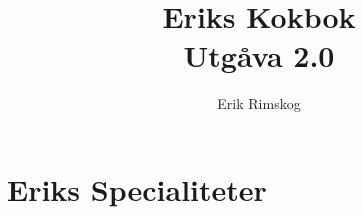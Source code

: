 \documentclass[12pt,a4paper]{article}
\title{\Huge Eriks Kokbok\\\medskip
  \large Utgåva 2.0}
\author{Erik Rimskog}
\begin{document}
\maketitle
\thispagestyle{empty}
\newpage
\tableofcontents
\newpage
\part{Eriks Specialiteter}

\newpage

\end{document}
